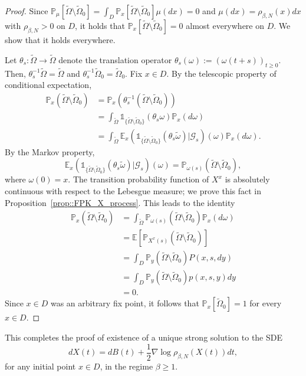\documentclass[11pt]{article}
\numberwithin{equation}{section}
\theoremstyle{definition}
\begin{document}
\begin{proof}
Since ${\mathbb{P}}_{\mu}[\tilde\Omega\setminus \tilde\Omega_{0}] = \int_{D}{\mathbb{P}}_{x}[\tilde\Omega\setminus \tilde\Omega_{0}] \mu(dx)=0$ and $\mu(dx)=\rho_{\beta,N}(x)dx$ with $\rho_{\beta,N}>0$ on $D$, it holds that ${\mathbb{P}}_{x}[\tilde\Omega\setminus \tilde\Omega_{0}]=0$ almost everywhere on $D$. We show that it holds everywhere.

Let $\theta_{s}:\tilde\Omega\to \tilde\Omega$ denote the translation operator $\theta_{s}(\omega) := (\omega(t+s))_{t\ge0}$. Then, $\theta^{-1}_{s}\tilde\Omega=\tilde\Omega$ and $\theta^{-1}_{s}\tilde\Omega_{0}=\tilde\Omega_{0}$. Fix $x\in D$. By the telescopic property of conditional expectation, 
\[
\begin{split}
    \mathbb{P}_{x}(\tilde\Omega \setminus \tilde\Omega_{0})
    &=  \mathbb{P}_{x}(\theta^{-1}_{s}(\tilde\Omega \setminus \tilde\Omega_{0}))\\
    &=\int_{\tilde\Omega}\mathds{1}_{\{\tilde\Omega \setminus \tilde\Omega_{0}\}}(\theta_{s}\omega)\mathbb{P}_{x}(d\omega)\\
    &= \int_{\tilde\Omega}\mathbb{E}_{x}\left(\mathds{1}_{\{\tilde\Omega \setminus \tilde\Omega_{0}\}}(\theta_{s}\tilde\omega)\Big|\mathcal{G}_{s}\right)(\omega)\mathbb{P}_{x}(d\omega).
\end{split}
\]
By the Markov property,
\[
    \mathbb{E}_{x}\left(\mathds{1}_{\{\tilde\Omega \setminus \tilde\Omega_{0}\}}(\theta_{s}\tilde\omega)\Big|\mathcal{G}_{s}\right)(\omega) 
    = \mathbb{P}_{\omega(s)}\left(\tilde\Omega\setminus\tilde\Omega_{0}\right),
\]
where $\omega(0)=x$. The transition probability function of $X^{x}$ is absolutely continuous with respect to the Lebesgue measure; we prove this fact in Proposition~\ref{prop::FPK_X_process}. This leads to the identity
\[
\begin{split}
    \mathbb{P}_{x}(\tilde\Omega \setminus \tilde\Omega_{0}) 
    &= \int_{\tilde\Omega}\mathbb{P}_{\omega(s)}(\tilde\Omega\setminus\tilde\Omega_{0})\mathbb{P}_{x}(d\omega)\\
    &=\mathbb{E}\left[\mathbb{P}_{X^{x}(s)}(\tilde\Omega\setminus\tilde\Omega_{0})\right]\\
    &= \int_{D}\mathbb{P}_{y}(\tilde\Omega\setminus\tilde\Omega_{0})P(x,s,dy)\\
    & = \int_{D}\mathbb{P}_{y}(\tilde\Omega\setminus\tilde\Omega_{0})p(x,s,y)dy\\
    & = 0.
\end{split}
\]
Since $x\in D$ was an arbitrary fix point, it follows that $\mathbb{P}_{x}[\tilde\Omega_{0}]=1$ for every $x\in D$.
\end{proof}
\noindent This completes the proof of existence of a unique strong solution to the SDE
\[
    dX(t) = dB(t) + \frac{1}{2}\nabla \log\rho_{\beta,N}(X(t))dt,
\]
for any initial point $x\in D$, in the regime $\beta\ge 1$.
\end{document}
